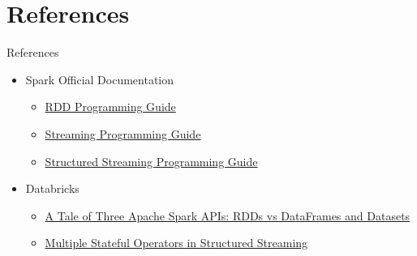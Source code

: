\documentclass{beamer}
\begin{document}
\section*{References}
\begin{frame}{References}
	\begin{itemize}
		\item{Spark Official Documentation}
		\begin{itemize}
			\item{\href{https://spark.apache.org/docs/latest/rdd-programming-guide.html}{RDD Programming Guide}}
			\item{\href{https://spark.apache.org/docs/latest/streaming-programming-guide.html}{Streaming Programming Guide}}
			\item{\href{https://spark.apache.org/docs/latest/structured-streaming-programming-guide.html}{Structured Streaming Programming Guide}}
		\end{itemize}
		\item{Databricks}
		\begin{itemize}
			\item{\href{https://www.databricks.com/blog/2016/07/14/a-tale-of-three-apache-spark-apis-rdds-dataframes-and-datasets.html}{A Tale of Three Apache Spark APIs: RDDs vs DataFrames and Datasets}}
			\item{\href{https://www.databricks.com/blog/multiple-stateful-operators-structured-streaming}{Multiple Stateful Operators in Structured Streaming}}
		\end{itemize}
		
	\end{itemize}
\end{frame}
\end{document}

